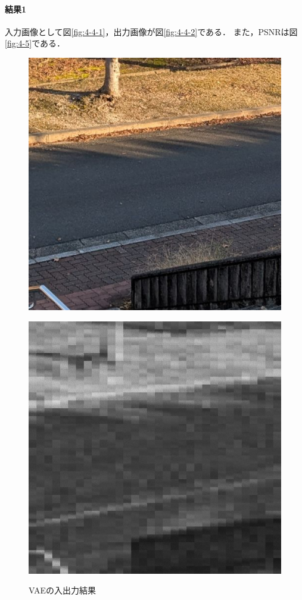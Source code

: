 \documentclass[twocolumn, a4j]{jsarticle}
\begin{document}
\paragraph{結果1}
入力画像として図\ref{fig:4-4-1}，出力画像が図\ref{fig:4-4-2}である．
また，PSNRは図\ref{fig:4-5}である．
\begin{figure}[h]
  \begin{minipage}[]{0.49\columnwidth}
    \centering
    \includegraphics[width=0.9\columnwidth]{figure/road_image2.bmp}
    \label{fig:4-4-1}
  \end{minipage}
  \begin{minipage}[]{0.49\linewidth}
    \centering
    \includegraphics[width=0.9\columnwidth]{figure/output_test2.bmp}
    \label{fig:4-4-2}
  \end{minipage}
  \caption{VAEの入出力結果}
  \label{fig:4-4}
\end{figure}
\end{document}

